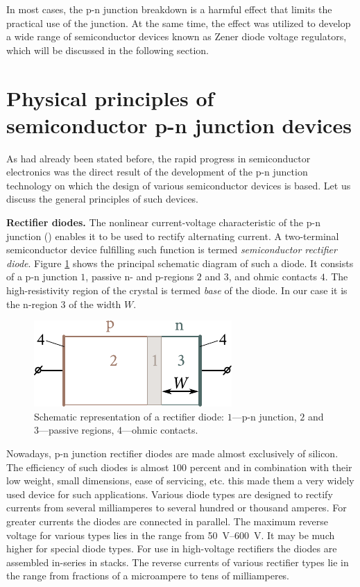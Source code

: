 In most cases, the p-n junction breakdown is a harmful effect that limits the practical use of the junction. At the same time, the effect was utilized to develop a wide range of semiconductor devices known as Zener diode voltage regulators, which will be discussed in the following section.

\section{Physical principles of semiconductor p-n junction devices}\label{sec:77}

As had already been stated before, the rapid progress in semiconductor electronics was the direct result of the development of the p-n junction technology on which the design of various semiconductor devices is based. Let us discuss the general principles of such devices.

\textbf{Rectifier diodes.} The nonlinear current-voltage characteristic of the p-n junction () enables it to be used to rectify alternating current. A two-terminal semiconductor device fulfilling such function is termed \textit{semiconductor rectifier diode}. Figure \ref{fig:8_17} shows the principal schematic diagram of such a diode. It consists of a p-n junction $1$, passive n- and p-regions $2$ and $3$, and ohmic contacts $4$. The high-resistivity region of the crystal is termed \textit{base} of the diode. In our case it is the n-region $3$ of the width $W$.

\begin{figure}[t]
	\begin{center}
		\includegraphics[scale=1.0]{figures/ch_08/fig_8_17.pdf}
		\caption[]{Schematic representation of a rectifier diode: $1$---p-n junction, $2$ and $3$---passive regions, $4$---ohmic contacts.}
		\label{fig:8_17}
	\end{center}
	\vspace{-0.8cm}
\end{figure}

Nowadays, p-n junction rectifier diodes are made almost exclusively of silicon. The efficiency of such diodes is almost $100$ percent and in combination with their low weight, small dimensions, ease of servicing, etc. this made them a very widely used device for such applications. Various diode types are designed to rectify currents from several milliamperes to several hundred or thousand amperes.
For greater currents the diodes are connected in parallel. The maximum reverse voltage for various types lies in the range from \SIrange{50}{600}{\volt}. It may be much higher for special diode types. For use in high-voltage rectifiers the diodes are assembled in-series in stacks. The reverse currents of various rectifier types lie in the range from fractions of a microampere to tens of milliamperes.

